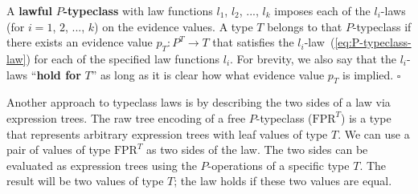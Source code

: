 A \textbf{lawful} $P$\textbf{-typeclass} with law functions $l_{1}$,
$l_{2}$, ..., $l_{k}$ imposes each of the $l_{i}$-laws (for $i=1$,
$2$, ..., $k$) on the evidence values. A type $T$ belongs to that
$P$-typeclass if there exists an evidence value $p_{T}:P^{T}\rightarrow T$
that satisfies the $l_{i}$-law~(\ref{eq:P-typeclass-law}) for each
of the specified law functions $l_{i}$. For brevity, we also say
that the $l_{i}$-laws \textsf{``}\textbf{hold for} $T$\textsf{''} as long as it
is clear how what evidence value $p_{T}$ is implied. $\square$

Another approach to typeclass laws is by describing the two sides
of a law via expression trees. The raw tree encoding of a free $P$-typeclass
($\text{FPR}^{T}$) is a type that represents arbitrary expression
trees with leaf values of type $T$. We can use a pair of values of
type $\text{FPR}^{T}$ as two sides of the law. The two sides can
be evaluated as expression trees using the $P$-operations of a specific
type $T$. The result will be two values of type $T$; the law holds
if these two values are equal.


